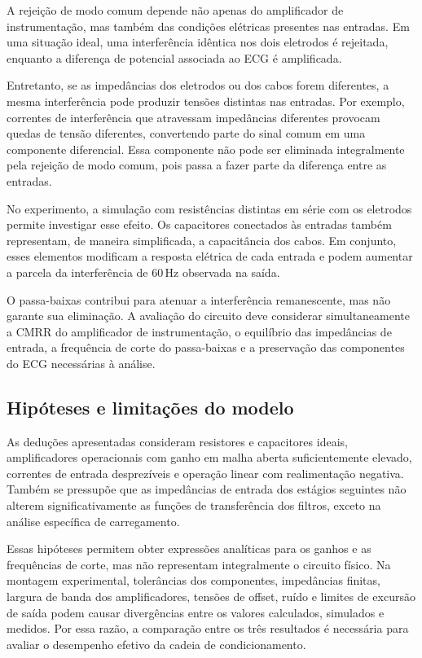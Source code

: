 \documentclass[11pt,a4paper]{article}
\begin{document}
A rejeição de modo comum depende não apenas do amplificador de instrumentação, mas também das condições elétricas presentes nas entradas. Em uma situação ideal, uma interferência idêntica nos dois eletrodos é rejeitada, enquanto a diferença de potencial associada ao ECG é amplificada.

Entretanto, se as impedâncias dos eletrodos ou dos cabos forem diferentes, a mesma interferência pode produzir tensões distintas nas entradas. Por exemplo, correntes de interferência que atravessam impedâncias diferentes provocam quedas de tensão diferentes, convertendo parte do sinal comum em uma componente diferencial. Essa componente não pode ser eliminada integralmente pela rejeição de modo comum, pois passa a fazer parte da diferença entre as entradas.

No experimento, a simulação com resistências distintas em série com os eletrodos permite investigar esse efeito. Os capacitores conectados às entradas também representam, de maneira simplificada, a capacitância dos cabos. Em conjunto, esses elementos modificam a resposta elétrica de cada entrada e podem aumentar a parcela da interferência de $60\,\mathrm{Hz}$ observada na saída.

O passa-baixas contribui para atenuar a interferência remanescente, mas não garante sua eliminação. A avaliação do circuito deve considerar simultaneamente a CMRR do amplificador de instrumentação, o equilíbrio das impedâncias de entrada, a frequência de corte do passa-baixas e a preservação das componentes do ECG necessárias à análise.

\subsection{Hipóteses e limitações do modelo}
\label{sec:hipoteses-limitacoes}

As deduções apresentadas consideram resistores e capacitores ideais, amplificadores operacionais com ganho em malha aberta suficientemente elevado, correntes de entrada desprezíveis e operação linear com realimentação negativa. Também se pressupõe que as impedâncias de entrada dos estágios seguintes não alterem significativamente as funções de transferência dos filtros, exceto na análise específica de carregamento.

Essas hipóteses permitem obter expressões analíticas para os ganhos e as frequências de corte, mas não representam integralmente o circuito físico. Na montagem experimental, tolerâncias dos componentes, impedâncias finitas, largura de banda dos amplificadores, tensões de offset, ruído e limites de excursão de saída podem causar divergências entre os valores calculados, simulados e medidos. Por essa razão, a comparação entre os três resultados é necessária para avaliar o desempenho efetivo da cadeia de condicionamento.
\end{document}
